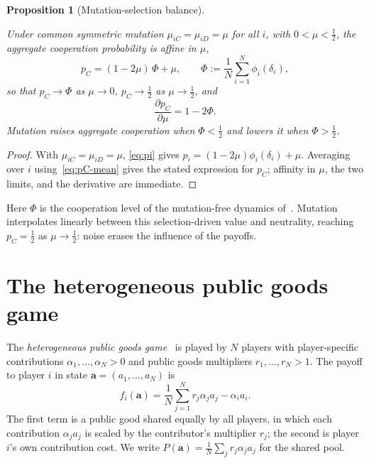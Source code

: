 \documentclass[11pt]{article}
\newtheorem{proposition}{Proposition}
\newcommand{\bfa}{\mathbf{a}}
\newcommand{\pC}{p_C}
\begin{document}
\begin{proposition}[Mutation-selection balance]\label{prop:balance}

Under common symmetric mutation \(\mu_{iC}=\mu_{iD}=\mu\) for all \(i\), with
\(0<\mu<\tfrac{1}{2}\), the aggregate cooperation probability is affine in \(\mu\),
\[
  \pC = (1-2\mu)\,\Phi + \mu, \qquad
  \Phi := \frac{1}{N}\sum_{i=1}^{N}\phi_i(\delta_i),
\]
so that \(\pC\to\Phi\) as \(\mu\to0\), \(\pC\to\tfrac{1}{2}\) as
\(\mu\to\tfrac{1}{2}\), and
\[
  \frac{\partial\pC}{\partial\mu} = 1-2\Phi.
\]
Mutation raises aggregate cooperation when \(\Phi<\tfrac{1}{2}\) and lowers it when
\(\Phi>\tfrac{1}{2}\).

\end{proposition}

\begin{proof}

With \(\mu_{iC}=\mu_{iD}=\mu\), \eqref{eq:pi} gives
\(p_i=(1-2\mu)\phi_i(\delta_i)+\mu\). Averaging over \(i\) using~\eqref{eq:pC-mean}
gives
the stated expression for \(\pC\); affinity in \(\mu\), the two limits, and the
derivative are immediate.

\end{proof}

Here \(\Phi\) is the cooperation level of the mutation-free dynamics
of~\cite{couto2023multiplayer}. Mutation interpolates linearly between this
selection-driven value and neutrality, reaching \(\pC=\tfrac{1}{2}\) as
\(\mu\to\tfrac{1}{2}\): noise erases the influence of the payoffs.

\section{The heterogeneous public goods game}\label{sec:payoff}

The \emph{heterogeneous public goods game}~\cite{hauser2019social} is played by \(N\)
players with player-specific contributions \(\alpha_1,\ldots,\alpha_N>0\) and public
goods
multipliers \(r_1,\ldots,r_N>1\). The payoff to player \(i\) in state
\(\bfa=(a_1,\ldots,a_N)\) is
\begin{equation}\label{eq:payoff}
  f_i(\bfa) = \frac{1}{N}\sum_{j=1}^N r_j\alpha_j a_j - \alpha_i a_i.
\end{equation}
The first term is a public good shared equally by all players, in which each
contribution \(\alpha_j a_j\) is scaled by the contributor's multiplier \(r_j\); the
second is player \(i\)'s own contribution cost. We write
\(P(\bfa)=\frac{1}{N}\sum_j r_j\alpha_j a_j\) for the shared pool.
\end{document}
